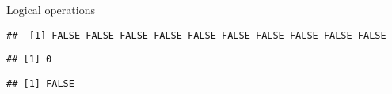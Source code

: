 \begin{frame}[fragile]{Logical operations}
\protect\hypertarget{logical-operations-1}{}

\begin{Shaded}
\begin{Highlighting}[]
\OperatorTok{==} 
\end{Highlighting}
\end{Shaded}

\begin{verbatim}
##  [1] FALSE FALSE FALSE FALSE FALSE FALSE FALSE FALSE FALSE FALSE
\end{verbatim}

\begin{Shaded}
\begin{Highlighting}[]
\OperatorTok{==}\NormalTok{)}
\end{Highlighting}
\end{Shaded}

\begin{verbatim}
## [1] 0
\end{verbatim}

\begin{Shaded}
\end{Shaded}

\begin{verbatim}
## [1] FALSE
\end{verbatim}

\end{frame}

